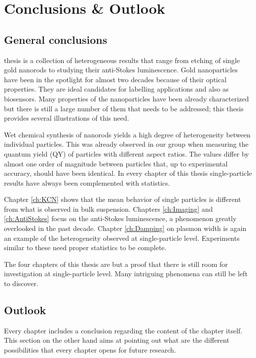 \chapter{Conclusions \& Outlook}
\label{conclusions}

\section{General conclusions}
 thesis is a collection of heterogeneous results that range from
etching of single gold nanorods to studying their anti-Stokes luminescence. Gold
nanoparticles have been in the spotlight for almost two decades because of their
optical properties\cite{Zijlstra2011}. They are ideal candidates for
labelling\cite{Leduc2013} applications and also as
biosensors\cite{Zijlstra2012}. Many properties of the nanoparticles have been
already characterized but there is still a large number of them that needs to be
addressed; this thesis provides several illustrations of this need.

Wet chemical synthesis of nanorods yields a high degree of heterogeneity between
individual particles\cite{Lee2013}. This was already observed in our group when
measuring the quantum yield (QY) of particles with different aspect
ratios\cite{Yorulmaz2012}. The values differ by almost one order of magnitude
between particles that, up to experimental accuracy, should have been identical.
In every chapter of this thesis single-particle results have always been
complemented with statistics.

Chapter \ref{ch:KCN} shows that the mean behavior of single particles is
different from what is observed in bulk suspension. Chapters \ref{ch:Imaging}
and \ref{ch:AntiStokes} focus on the anti-Stokes luminescence, a phenomenon
greatly overlooked in the past decade. Chapter \ref{ch:Damping} on plasmon width
is again an example of the heterogeneity observed at single-particle level.
Experiments similar to these need proper statistics to be complete.

The four chapters of this thesis are but a proof that there is still room for
investigation at single-particle level. Many intriguing phenomena can still be
left to discover. 

\section{Outlook}
Every chapter includes a conclusion regarding the content of the chapter itself.
This section on the other hand aims at pointing out what are the different
possibilities that every chapter opens for future research.

